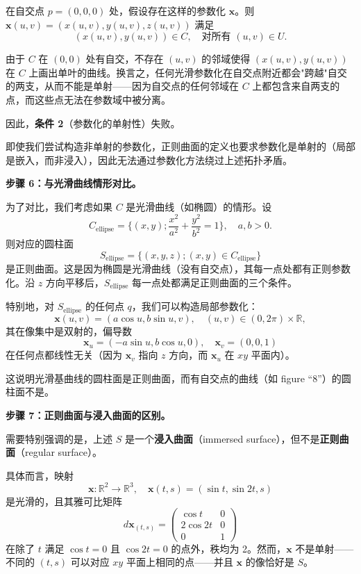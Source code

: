 \begin{solution}
在自交点 $p = (0, 0, 0)$ 处，假设存在这样的参数化 $\mathbf{x}$。则 $\mathbf{x}(u, v) = (x(u,v), y(u,v), z(u,v))$ 满足
\[
(x(u,v), y(u,v)) \in C, \quad \text{对所有 } (u,v) \in U.
\]

由于 $C$ 在 $(0,0)$ 处有自交，不存在 $(u,v)$ 的邻域使得 $(x(u,v), y(u,v))$ 在 $C$ 上画出单叶的曲线。换言之，任何光滑参数化在自交点附近都会"跨越"自交的两支，从而不能是单射——因为自交点的任何邻域在 $C$ 上都包含来自两支的点，而这些点无法在参数域中被分离。

因此，\textbf{条件 2}（参数化的单射性）失败。

即使我们尝试构造非单射的参数化，正则曲面的定义也要求参数化是单射的（局部是嵌入，而非浸入），因此无法通过参数化方法绕过上述拓扑矛盾。

\vspace{1ex}
\noindent\textbf{步骤 6：与光滑曲线情形对比。}

为了对比，我们考虑如果 $C$ 是光滑曲线（如椭圆）的情形。设
\[
C_{\text{ellipse}} = \{(x, y) ; \frac{x^2}{a^2} + \frac{y^2}{b^2} = 1\}, \quad a, b > 0.
\]
则对应的圆柱面
\[
S_{\text{ellipse}} = \{(x, y, z) ; (x, y) \in C_{\text{ellipse}}\}
\]
是正则曲面。这是因为椭圆是光滑曲线（没有自交点），其每一点处都有正则参数化。沿 $z$ 方向平移后，$S_{\text{ellipse}}$ 每一点处都满足正则曲面的三个条件。

特别地，对 $S_{\text{ellipse}}$ 的任何点 $q$，我们可以构造局部参数化：
\[
\mathbf{x}(u, v) = (a \cos u, b \sin u, v), \quad (u, v) \in (0, 2\pi) \times \mathbb{R},
\]
其在像集中是双射的，偏导数
\[
\mathbf{x}_u = (-a \sin u, b \cos u, 0), \quad \mathbf{x}_v = (0, 0, 1)
\]
在任何点都线性无关（因为 $\mathbf{x}_v$ 指向 $z$ 方向，而 $\mathbf{x}_u$ 在 $xy$ 平面内）。

这说明光滑基曲线的圆柱面是正则曲面，而有自交点的曲线（如 figure ``8''）的圆柱面不是。

\vspace{1ex}
\noindent\textbf{步骤 7：正则曲面与浸入曲面的区别。}

需要特别强调的是，上述 $S$ 是一个\textbf{浸入曲面}（immersed surface），但不是\textbf{正则曲面}（regular surface）。

具体而言，映射
\[
\mathbf{x} : \mathbb{R}^2 \to \mathbb{R}^3, \quad \mathbf{x}(t, s) = (\sin t, \sin 2t, s)
\]
是光滑的，且其雅可比矩阵
\[
d\mathbf{x}_{(t,s)} = \begin{pmatrix}
\cos t & 0 \\
2\cos 2t & 0 \\
0 & 1
\end{pmatrix}
\]
在除了 $t$ 满足 $\cos t = 0$ 且 $\cos 2t = 0$ 的点外，秩均为 2。然而，$\mathbf{x}$ 不是单射——不同的 $(t,s)$ 可以对应 $xy$ 平面上相同的点——并且 $\mathbf{x}$ 的像恰好是 $S$。


\end{solution}
